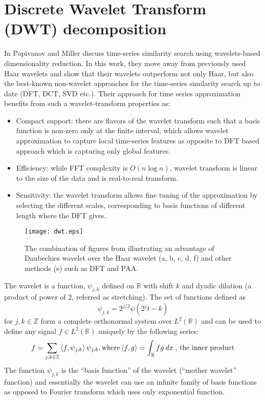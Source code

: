 \section{Discrete Wavelet Transform (DWT) decomposition}
In \cite{citeulike:3734066} Popivanov and Miller discuss time-series similarity search using wavelets-based dimensionality reduction. In this work, they move away from previously used Haar wavelets \cite{citeulike:4384535} and show that their wavelets outperform not only Haar, but also the best-known non-wavelet approaches for the time-series similarity search up to date (DFT, DCT, SVD etc.). Their approach for time series approximation benefits from such a wavelet-transform properties as:
\begin{itemize}
	\item{Compact support: there are flavors of the wavelet transform such that a basis function is non-zero only at the finite interval, which allows wavelet approximation to capture local time-series features as opposite to DFT based approach which is capturing only global features.}
	\item{Efficiency: while FFT complexity is $O(n \log{n})$, wavelet transform is linear to the size of the data and is real-to-real transform.}
	\item{Sensitivity: the wavelet transform allows fine tuning of the approximation by selecting the different scales, corresponding to basis functions of different length where the DFT gives.}
\end{itemize}

\begin{figure}[tbp]
   \centering
   \texttt{[image: dwt.eps]}
   \caption{The combination of figures from \cite{citeulike:3734066} illustrating an advantage of Daubechies wavelet over the Haar wavelet (a, b, c, d, f) and other methods (e) such as DFT and PAA.}
   \label{fig:dwt}
\end{figure} 

The wavelet is a function, $\psi_{j,k}$ defined on $\mathbb{R}$ with shift $k$ and dyadic dilation (a product of power of $2$, referred as stretching). The set of functions defined as
\begin{equation}
\psi_{j,k} = 2^{j/2} \psi \left( 2^{j}t - k \right)  
\label{eq:wavelet}
\end{equation} 
for $j, k \in \mathbb{Z}$ form a complete orthonormal system over $L^{2}(\mathbb{R})$ and can be used to define any signal $f \in L^{2}(\mathbb{R})$ uniquely by the following series: 
\begin{equation}
f = \sum_{j, k \in \mathbb{Z}} \left\langle f, \psi_{j,k} \right\rangle  \psi_{j,k}, \\
\text{where} \left\langle f,g \right\rangle = \int_{\mathbb{R}} f g \: dx \; \text{, the inner product}
\label{eq:wavelet_series}
\end{equation} 
The function $\psi_{j,k}$ is the ``basis function'' of the wavelet (``mother wavelet'' function) and essentially the wavelet can use an infinite family of basis functions as opposed to Fourier transform which uses only exponential function. 

